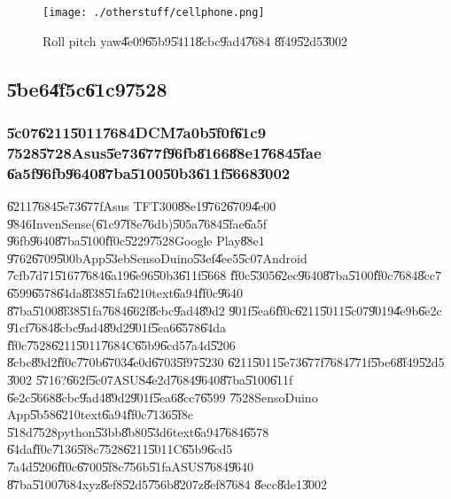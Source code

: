 \clearpage%

\begin{figure}[th]
\caption{Roll pitch yaw\U{4e09}\U{65b9}\U{5411}\U{8cbc}\U{9ad4}\U{7684}%
\U{8f49}\U{52d5}\U{3002}}
\begin{center}
\texttt{[image: ./otherstuff/cellphone.png]}
\end{center}
\end{figure}

\bigskip

\subsection{\U{5be6}\U{4f5c}\U{61c9}\U{7528}}

\subsubsection{\U{5c07}\U{6211}\U{5011}\U{7684}DCM\U{7a0b}\U{5f0f}\U{61c9}%
\U{7528}\U{5728}Asus\U{5e73}\U{677f}\U{96fb}\U{8166}\U{88e1}\U{7684}\U{5fae}%
\U{6a5f}\U{96fb}\U{9640}\U{87ba}\U{5100}\U{50b3}\U{611f}\U{5668}\U{3002}}

\U{6211}\U{7684}\U{5e73}\U{677f}Asus TFT300\U{88e1}\U{9762}\U{6709}\U{4e00}%
\U{9846}InvenSense(\U{61c9}\U{7f8e}\U{76db})\U{505a}\U{7684}\U{5fae}\U{6a5f}%
\U{96fb}\U{9640}\U{87ba}\U{5100}\U{ff0c}\U{5229}\U{7528}Google Play\U{88e1}%
\U{9762}\U{6709}\U{500b}App\U{53eb}SensoDuino\U{53ef}\U{4ee5}\U{5c07}Android%
\U{7cfb}\U{7d71}\U{5167}\U{7684}\U{6a19}\U{6e96}\U{50b3}\U{611f}\U{5668}%
\U{ff0c}\U{5305}\U{62ec}\U{9640}\U{87ba}\U{5100}\U{ff0c}\U{7684}\U{8cc7}%
\U{6599}\U{6578}\U{64da}\U{8f38}\U{51fa}\U{6210}text\U{6a94}\U{ff0c}\U{9640}%
\U{87ba}\U{5100}\U{8f38}\U{51fa}\U{7684}\U{662f}\U{8cbc}\U{9ad4}\U{89d2}%
\U{901f}\U{5ea6}\U{ff0c}\U{6211}\U{5011}\U{5c07}\U{9019}\U{4e9b}\U{6e2c}%
\U{91cf}\U{7684}\U{8cbc}\U{9ad4}\U{89d2}\U{901f}\U{5ea6}\U{6578}\U{64da}%
\U{ff0c}\U{7528}\U{6211}\U{5011}\U{7684}C\U{65b9}\U{6cd5}\U{7a4d}\U{5206}%
\U{8cbc}\U{89d2}\U{ff0c}\U{770b}\U{6703}\U{4e0d}\U{6703}\U{5f97}\U{5230}%
\U{6211}\U{5011}\U{5e73}\U{677f}\U{7684}\U{771f}\U{5be6}\U{8f49}\U{52d5}%
\U{3002}\newline
\U{5716}?\U{662f}\U{5c07}ASUS\U{4e2d}\U{7684}\U{9640}\U{87ba}\U{5100}\U{611f}%
\U{6e2c}\U{5668}\U{8cbc}\U{9ad4}\U{89d2}\U{901f}\U{5ea6}\U{8cc7}\U{6599}%
\U{7528}SensoDuino App\U{5b58}\U{6210}text\U{6a94}\U{ff0c}\U{7136}\U{5f8c}%
\U{518d}\U{7528}python\U{53bb}\U{8b80}\U{53d6}text\U{6a94}\U{7684}\U{6578}%
\U{64da}\U{ff0c}\U{7136}\U{5f8c}\U{7528}\U{6211}\U{5011}C\U{65b9}\U{6cd5}%
\U{7a4d}\U{5206}\U{ff0c}\U{6700}\U{5f8c}\U{756b}\U{51fa}ASUS\U{7684}\U{9640}%
\U{87ba}\U{5100}\U{7684}xyz\U{8ef8}\U{52d5}\U{756b}\U{8207}z\U{8ef8}\U{7684}%
\U{8ecc}\U{8de1}\U{3002}

